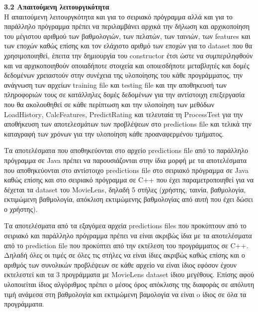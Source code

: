 \documentclass{report}
\begin{document}
\textbf{\large{3.2 Απαιτούμενη λειτουργικότητα}}
\\
Η απαιτούμενη λειτουργκότητα και για το σειριακό πρόγραμμα αλλά και για το παράλληλο πρόγραμμα πρέπει να περιλαμβάνει αρχικά την δήλωση και αρχικοποίηση του μέγιστου αριθμού των βαθμολογιών, των πελατών, των ταινιών, των \textlatin{features} και των εποχών καθώς επίσης και τον ελάχιστο αριθμό των εποχών για το \textlatin{dataset} που θα χρησιμοποιηθεί, έπειτα την δημιουργία του \textlatin{constructor} έτσι ώστε να συμπεριληφθούν και να αρχικοποιηθούν οποιαδήποτε στοιχεία και οποιεσδήποτε μεταβλητές και δομές δεδομένων χρειαστούν στην συνέχεια της υλοποίησης του κάθε προγράμματος, την ανάγνωση των αρχείων \textlatin{training file} και \textlatin{testing file} και την αποθηκευσή των πληροφοριών τους σε κατάλληλες δομές δεδομένων για την αντίστοιχη επεξεργασία που θα ακολουθηθεί σε κάθε περίπτωση και την υλοποίηση των μεθόδων \textlatin{LoadHistory}, \textlatin{CalcFeatures}, \textlatin{PredictRating} και τελευταία τη \textlatin{ProcessTest} για την αποθήκευση των αποτελεσμάτων των προβλέψεων στο \textlatin{predictions file} και τελικά την καταγραφή των χρόνων για την υλοποίηση κάθε προαναφερμένου τμήματος.  

Τα αποτελέσματα που αποθηκεύονται στο αρχείο \textlatin{predictions file}  από το  παράλληλο πρόγραμμα σε \textlatin{Java} πρέπει να παρουσιάζονται στην ίδια μορφή με τα αποτελέσματα που αποθηκεύονται στο αντίστοιχο \textlatin{predictions file} στο σειριακό πρόγραμμα σε \textlatin{Java} καθώς επίσης και στο σειριακό πρόγραμμα σε \textlatin{C++} που έχει παραμετροποιηθεί για να δέχεται τα \textlatin{dataset} του \textlatin{MovieLens}, δηλαδή 5 στήλες (χρήστης, ταινία, βαθμολογία, εκτιμώμενη βαθμολογία, απόκλιση εκτιμώμενης βαθμολογίας από αυτή που έχει δώσει ο χρήστης).

Τα αποτελέσματα από τα εξαγόμεα αρχεία \textlatin{predictions files} που προκύπτουν από το σειριακό και παράλληλο πρόγραμμα πρέπει να είναι ακριβώς ίδια με τα αποτελέσματα από το \textlatin{prediction file} που προκύπτει από την εκτέλεση του προγράμματος σε \textlatin{C++}. Δηλαδή όλες οι τιμές σε όλες τις στήλες να είναι ίδιες ακριβώς καθώς επίσης και ο αριθμός των συνολικών προβλέψεων σε κάθε αρχείο να είναι ίδιος εφόσον έχουν εκτελεστεί και τα 3 προγράμματα με \textlatin{MovieLens dataset} ίδιου μεγέθους. Επίσης αφού υλοποιείται ίδιος αλγόριθμος πρέπει ο μέσος όρος απόκλισης της διαφοράς σε απόλυτη τιμή ανάμεσα στη βαθμολογία και εκτιμώμενη βαμολογία να είναι o ίδιος σε όλα τα προγράμματα.
\end{document}

